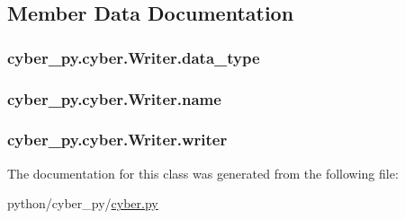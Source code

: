 \subsection{Member Data Documentation}
\hypertarget{classcyber__py_1_1cyber_1_1Writer_a9ad78a9c6ec32e9cc9f56cff9c6be6ad}{
\subsubsection[{data\-\_\-type}]{\setlength{\rightskip}{0pt plus 5cm}cyber\-\_\-py.\-cyber.\-Writer.\-data\-\_\-type}}\label{classcyber__py_1_1cyber_1_1Writer_a9ad78a9c6ec32e9cc9f56cff9c6be6ad}
\hypertarget{classcyber__py_1_1cyber_1_1Writer_aae9aa5c2f9390d4ab157294a29c7d2a2}{
\subsubsection[{name}]{\setlength{\rightskip}{0pt plus 5cm}cyber\-\_\-py.\-cyber.\-Writer.\-name}}\label{classcyber__py_1_1cyber_1_1Writer_aae9aa5c2f9390d4ab157294a29c7d2a2}
\hypertarget{classcyber__py_1_1cyber_1_1Writer_a560cf803725f9c259059956211418582}{
\subsubsection[{writer}]{\setlength{\rightskip}{0pt plus 5cm}cyber\-\_\-py.\-cyber.\-Writer.\-writer}}\label{classcyber__py_1_1cyber_1_1Writer_a560cf803725f9c259059956211418582}


The documentation for this class was generated from the following file\-:\begin{DoxyCompactItemize}
\item 
python/cyber\-\_\-py/\hyperlink{cyber_8py}{cyber.\-py}\end{DoxyCompactItemize}
